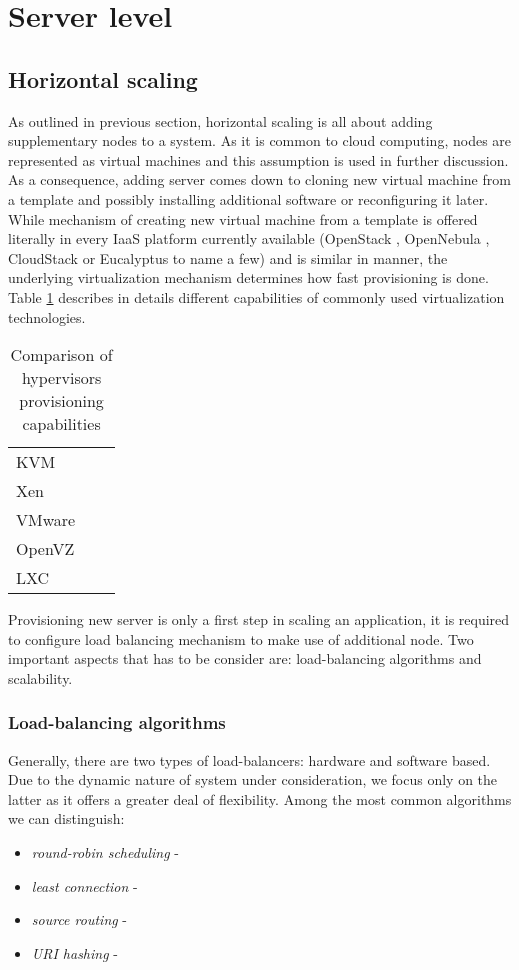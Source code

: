 \section{Server level}

\subsection{Horizontal scaling}
As outlined in previous section, horizontal scaling is all about adding supplementary nodes to a system. As it is common to cloud computing, nodes are represented as virtual machines and this assumption is used in further discussion. As a consequence, adding server comes down to cloning new virtual machine from a template and possibly installing additional software or reconfiguring it later. While mechanism of creating new virtual machine from a template is offered literally in every IaaS platform currently available (OpenStack \cite{OpenStack}, OpenNebula \cite{OpenNebula}, CloudStack \cite{CloudStack} or Eucalyptus \cite{Eucalyptus} to name a few) and is similar in manner, the underlying virtualization mechanism determines how fast provisioning is done. Table \ref{tab:hypervisors-provisioning} describes in details different capabilities of commonly used virtualization technologies.

\begin{table}[!htbp]
\begin{tabularx}{\textwidth}{l | X | X}
 &  & \\
\hline 
KVM &  & \\
\hline
Xen &  & \\
\hline
VMware &  & \\
\hline
OpenVZ &  & \\
\hline
LXC &  &  \\
\end{tabularx}
\caption{Comparison of hypervisors provisioning capabilities}
\label{tab:hypervisors-provisioning}
\end{table}

Provisioning new server is only a first step in scaling an application, it is required to configure load balancing mechanism to make use of additional node. Two important aspects that has to be consider are: load-balancing algorithms and scalability.

\subsubsection{Load-balancing algorithms}
Generally, there are two types of load-balancers: hardware and software based. Due to the dynamic nature of system under consideration, we focus only on the latter as it offers a greater deal of flexibility. Among the most common algorithms we can distinguish:
\begin{itemize}
 \item \textit{round-robin scheduling} - 
 \item \textit{least connection} - 
 \item \textit{source routing} - 
 \item \textit{URI hashing} - 
\end{itemize}

